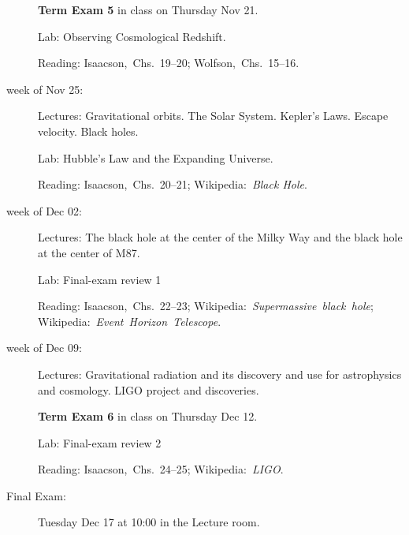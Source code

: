 \documentclass[12pt, letterpaper]{article}
\begin{document}
\begin{description}
  \textbf{Term Exam 5} in class on Thursday Nov 21.

  Lab: Observing Cosmological Redshift.

  Reading: Isaacson,~Chs.~19--20;
           Wolfson,~Chs.~15--16.

\item[week of Nov 25:] Lectures: Gravitational orbits. The Solar System. Kepler's
  Laws. Escape velocity. Black holes.

  Lab: Hubble's Law and the Expanding Universe.

  Reading: Isaacson,~Chs.~20--21;
  Wikipedia:~\textit{Black Hole}.

\item[week of Dec 02:] Lectures: The black hole at the center of the
  Milky Way and the black hole at the center of M87.

  Lab: Final-exam review 1

  Reading: Isaacson,~Chs.~22--23;
  Wikipedia:~\textit{Supermassive~black~hole};
  Wikipedia:~\textit{Event~Horizon~Telescope}.

\item[week of Dec 09:] Lectures: Gravitational radiation and its
  discovery and use for astrophysics and cosmology. LIGO project and
  discoveries.

  \textbf{Term Exam 6} in class on Thursday Dec 12.

  Lab: Final-exam review 2

  Reading: Isaacson,~Chs.~24--25;
  Wikipedia:~\textit{LIGO}.

\item[Final Exam:] Tuesday Dec 17 at 10:00 in the Lecture room.
\end{description}
\end{document}
